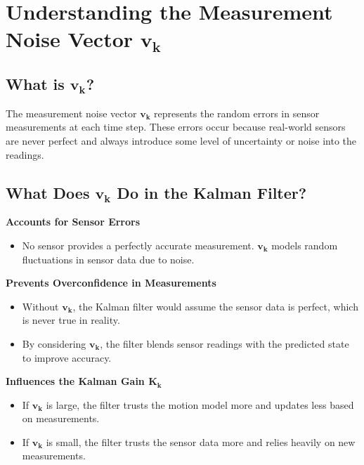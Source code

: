 \documentclass{article}
\begin{document}
\newpage


\section{Understanding the Measurement Noise Vector \(\mathbf{v_k}\)}

\subsection*{What is \(\mathbf{v_k}\)?}
The measurement noise vector \(\mathbf{v_k}\) represents the random errors in sensor measurements at each time step. These errors occur because real-world sensors are never perfect and always introduce some level of uncertainty or noise into the readings.

\subsection*{What Does \(\mathbf{v_k}\) Do in the Kalman Filter?}

\textbf{Accounts for Sensor Errors}  
\begin{itemize}
    \item No sensor provides a perfectly accurate measurement. \(\mathbf{v_k}\) models random fluctuations in sensor data due to noise.
\end{itemize}

\textbf{Prevents Overconfidence in Measurements}  
\begin{itemize}
    \item Without \(\mathbf{v_k}\), the Kalman filter would assume the sensor data is perfect, which is never true in reality.
    \item By considering \(\mathbf{v_k}\), the filter blends sensor readings with the predicted state to improve accuracy.
\end{itemize}

\textbf{Influences the Kalman Gain \(\mathbf{K_k}\)}  
\begin{itemize}
    \item If \(\mathbf{v_k}\) is large, the filter trusts the motion model more and updates less based on measurements.
    \item If \(\mathbf{v_k}\) is small, the filter trusts the sensor data more and relies heavily on new measurements.
\end{itemize}
\end{document}
